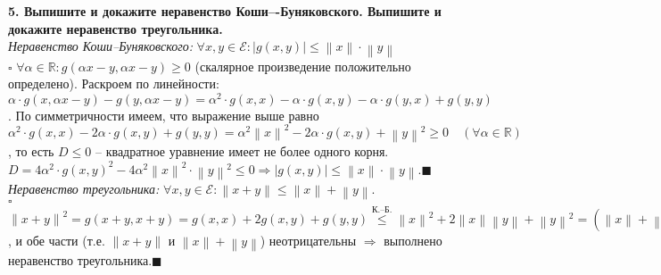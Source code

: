 \documentclass[11pt,a4paper]{article}
\newcommand{\R}{\mathbb{R}}
\newcommand{\E}{\mathcal{E}}
\newcommand{\proof}{$\square$ }
\newcommand{\qed}{\hfill$\blacksquare$}
\begin{document}
\textbf{5. Выпишите и докажите неравенство Коши–-Буняковского. Выпишите и докажите неравенство треугольника.\\}
\textit{Неравенство Коши--Буняковского:} $\forall x, y \in \E: \left\vert g(x, y) \right\vert \leq \left\| x \right\| \cdot \left\| y \right\|$\\
\proof $\forall \alpha \in \R : g(\alpha x - y, \alpha x - y) \geq 0$ (скалярное произведение положительно определено). Раскроем по линейности: $\alpha \cdot g(x, \alpha x - y) - g(y, \alpha x - y) = \alpha^2 \cdot g(x, x) - \alpha \cdot g(x, y) - \alpha \cdot g(y, x) + g(y, y)$. По симметричности имеем, что выражение выше равно $\alpha^2 \cdot g(x, x) - 2\alpha \cdot g(x, y) + g(y, y) = \alpha^2 \left\| x \right\|^2 - 2\alpha \cdot g(x, y) + \left\| y \right\|^2 \geq 0 \quad (\forall \alpha \in \R)$, то есть $D \leq 0$ -- квадратное уравнение имеет не более одного корня.\\
$D = 4\alpha^2 \cdot g(x, y)^2 - 4\alpha^2 \left\| x \right\|^2 \cdot \left\| y \right\|^2 \leq 0 \Rightarrow |g(x, y)| \leq \left\| x \right\| \cdot \left\| y \right\|$.\qed\\
\textit{Неравенство треугольника:} $\forall x, y \in \E: \left\| x + y \right\| \leq \left\| x \right\| + \left\| y \right\|$.\\
\proof $\left\| x + y \right\|^2 = g(x + y, x + y) = g(x, x) + 2g(x, y) + g(y, y) \stackrel{\text{К.--Б.}}{\leq} \left\| x \right\|^2 + 2 \left\| x \right\| \left\| y \right\| + \left\| y \right\|^2 = \left( \left\| x \right\| + \left\| y \right\| \right)^2$, и обе части (т.е. $\left\| x + y \right\|$ и $\left\| x \right\| + \left\| y \right\|$) неотрицательны $\Rightarrow$ выполнено неравенство треугольника.\qed
\end{document}
